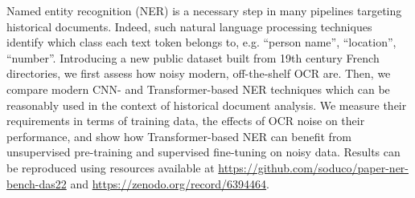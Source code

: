 Named entity recognition (NER) is a necessary step in many pipelines targeting historical documents.
Indeed, such natural language processing techniques identify which class each text token belongs to,
e.g. ``person name'', ``location'', ``number''.
Introducing a new public dataset built from 19th century French directories,
we first assess how noisy modern, off-the-shelf OCR are.
Then, we compare modern CNN- and Transformer-based NER techniques
which can be reasonably used in the context of historical document analysis.
We measure their requirements in terms of training data,
the effects of OCR noise on their performance,
and show how Transformer-based NER can benefit from unsupervised pre-training 
and supervised fine-tuning on noisy data.
Results can be reproduced using resources available at \url{https://github.com/soduco/paper-ner-bench-das22} and \url{https://zenodo.org/record/6394464}.
